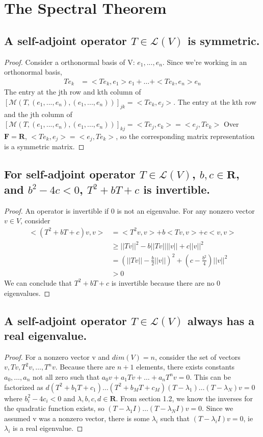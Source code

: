 \documentclass{article}
\begin{document}
\section{The Spectral Theorem}

\subsection{A self-adjoint operator $T \in \mathcal{L}(V)$ is symmetric.}
\begin{proof}
Consider a orthonormal basis of V: $e_1, ..., e_n$. Since we're working in an orthonormal basis, 
\begin{align*}
Te_k &= <Te_k, e_1>e_1 + \dotsc + <Te_k, e_n>e_n 
\end{align*}
The entry at the jth row and kth column of $[\mathcal{M}(T, (e_1, ..., e_n), (e_1, ..., e_n))]_{jk} = <Te_k, e_j> $. The entry at the kth row and the jth column of $[\mathcal{M}(T, (e_1, ..., e_n), (e_1, ..., e_n))]_{kj} = <Te_j,e_k> = <e_j, Te_k>$ Over $\mathbf{F = R}$, $<Te_k, e_j> = <e_j, Te_k>$, so the corresponding matrix representation is a symmetric matrix.
\end{proof}
\subsection{For self-adjoint operator $T \in \mathcal{L}(V)$, $b, c \in \mathbf{R}$, and $b^2 - 4c < 0$, $T^2 + bT + c$ is invertible.}
\begin{proof}
An operator is invertible if 0 is not an eigenvalue. For any nonzero vector $v \in V$, consider 
\begin{align*}
<(T^2 + bT + c)v, v> &= <T^2v, v> + b<Tv, v> + c<v,v> \\ 
&\geq ||Tv||^2 -  b||Tv|| ||v|| + c||v||^2 \\
&= (||Tv||-\frac{b}{2}||v||)^2 + (c - \frac{b^2}{4})||v||^2 \\
&> 0
\end{align*}
We can conclude that $T^2 + bT + c$ is invertible because there are no 0 eigenvalues.
\end{proof}
\subsection{A self-adjoint operator $T \in \mathcal{L}(V)$ always has a real eigenvalue.}
\begin{proof}
For a nonzero vector v and $dim(V) = n$, consider the set of vectors $v, Tv, T^2v, \dots, T^nv.$ Because there are $n+1$ elements, there exists constants $a_0, \dots, a_n$ not all zero such that $a_0v + a_1Tv + \dots + a_nT^nv = 0$. This can be factorized as $d(T^2 + b_1T + c_1)\dotsc(T^2 + b_MT + c_M)(T-\lambda_1)\dotsc(T-\lambda_N)v = 0$ where $b_i^2-4c_i < 0$ and $\lambda, b, c, d \in \mathbf{R}$. From section 1.2, we know the inverses for the quadratic function exists, so $(T-\lambda_1I)\dotsc(T-\lambda_NI)v = 0$. Since we assumed v was a nonzero vector, there is some $\lambda_i$ such that $(T-\lambda_iI)v = 0$, ie $\lambda_i$ is a real eigenvalue.
\end{proof}
\end{document}
